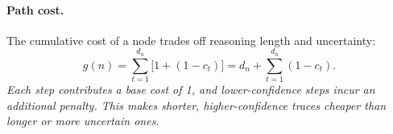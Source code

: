 \documentclass{article}
\begin{document}
\paragraph{Path cost.}
The cumulative cost of a node trades off reasoning length and uncertainty:
\begin{equation}
g(n) = \sum_{t=1}^{d_n} \big[1 + (1-c_t)\big]
    = d_n + \sum_{t=1}^{d_n}(1-c_t).
\label{eq:gcost}
\end{equation}
\textit{Each step contributes a base cost of 1, and lower-confidence steps incur an additional penalty. This makes shorter, higher-confidence traces cheaper than longer or more uncertain ones.}



\end{document}
